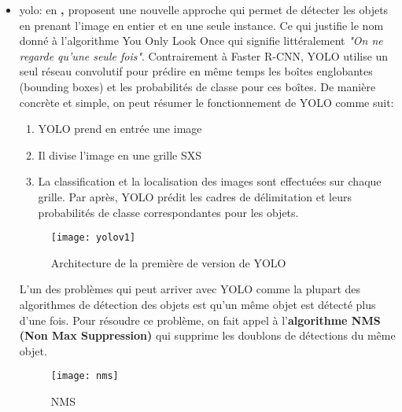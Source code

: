 \begin{itemize}
            \item \acrfull{yolo}: en \textbf{\citeyear{redmon2016look}, \citeauthor{redmon2016look}} proposent une nouvelle approche qui permet de détecter les objets en prenant l’image en entier et en une seule instance. Ce qui justifie le nom donné à l’algorithme You Only Look Once qui signifie littéralement \textit{"On ne regarde qu’une seule fois"}. Contrairement à Faster R-CNN, YOLO utilise un seul réseau convolutif pour prédire en même temps les boîtes englobantes (bounding boxes) et les probabilités de classe pour ces boîtes.
            De manière concrète et simple, on peut résumer le fonctionnement de YOLO comme suit:
                \begin{enumerate}
                    \item YOLO prend en entrée une image
                    \item Il divise l’image en une grille SXS
                    \item La classification et la localisation des images sont effectuées sur chaque grille. Par après, YOLO prédit les cadres de délimitation et leurs probabilités de classe correspondantes pour les objets. 
                \end{enumerate}
                \begin{figure}[H]
                    \centering
                    \texttt{[image: yolov1]}
                    \caption{Architecture de la première de version de YOLO}
                \end{figure}
            L’un des problèmes qui peut arriver avec YOLO comme la plupart des algorithmes de détection des objets est qu’un même objet est détecté plus d’une fois. Pour résoudre ce problème, on fait appel à l’\textbf{algorithme NMS (Non Max Suppression)} qui supprime les doublons de détections du même objet.
                
            \begin{figure}[H]
                \centering
                \texttt{[image: nms]}
                \caption{NMS}
            \end{figure}


\end{itemize}
